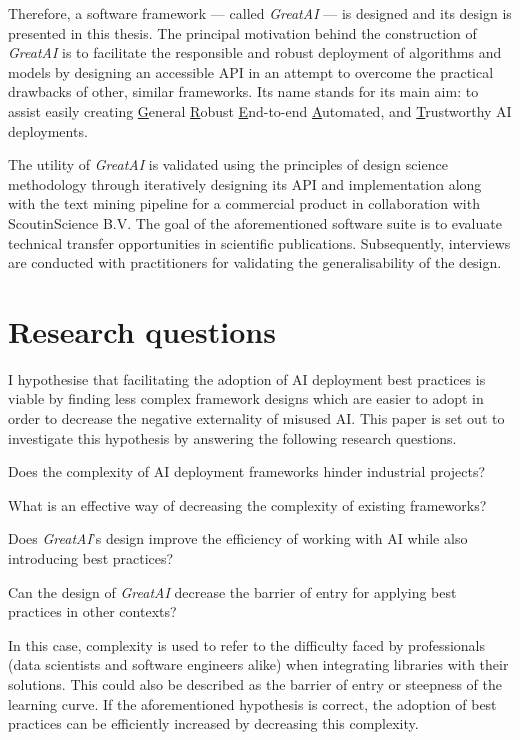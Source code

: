 Therefore, a software framework --- called \textit{GreatAI} --- is designed and its design is presented in this thesis. The principal motivation behind the construction of \textit{GreatAI} is to facilitate the responsible and robust deployment of algorithms and models by designing an accessible API in an attempt to overcome the practical drawbacks of other, similar frameworks. Its name stands for its main aim: to assist easily creating \underline{G}eneral \underline{R}obust \underline{E}nd-to-end \underline{A}utomated, and \underline{T}rustworthy AI deployments.

The utility of \textit{GreatAI} is validated using the principles of design science methodology \cite{wieringa2014design} through iteratively designing its API and implementation along with the text mining pipeline for a commercial product in collaboration with ScoutinScience B.V. The goal of the aforementioned software suite is to evaluate technical transfer opportunities in scientific publications. Subsequently, interviews are conducted with practitioners for validating the generalisability of the design.

\section{Research questions}

I hypothesise that facilitating the adoption of AI deployment best practices is viable by finding less complex framework designs which are easier to adopt in order to decrease the negative externality of misused AI. This paper is set out to investigate this hypothesis by answering the following research questions. 

\begin{rqlist}
  \item Does the complexity of AI deployment frameworks hinder industrial projects?
  \item What is an effective way of decreasing the complexity of existing frameworks?
  \item Does \textit{GreatAI}'s design improve the efficiency of working with AI while also introducing best practices?
  \item Can the design of \textit{GreatAI} decrease the barrier of entry for applying best practices in other contexts?
\end{rqlist}

In this case, complexity is used to refer to the difficulty faced by professionals (data scientists and software engineers alike) when integrating libraries with their solutions. This could also be described as the barrier of entry or steepness of the learning curve. If the aforementioned hypothesis is correct, the adoption of best practices can be efficiently increased by decreasing this complexity.


